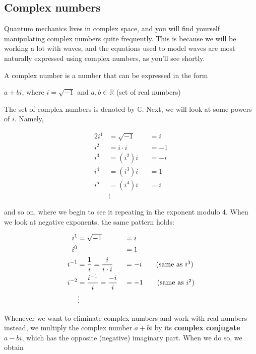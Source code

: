 \subsection{Complex numbers} \label{sec:complex}

Quantum mechanics lives in complex space, and you will find yourself manipulating complex numbers quite frequently. 
This is because we will be working a lot with waves, and the equations used to model waves are most naturally expressed using complex numbers, as you'll see shortly.

A complex number is a number that can be expressed in the form 

\begin{tcolorbox}[title=Complex numbers]
	$a + bi$, where $i = \sqrt{-1}$ and $a,b \in \mathbb{R}$ (set of real numbers)
\end{tcolorbox}

The set of complex numbers is denoted by $\mathbb{C}$.
Next, we will look at some powers of $i$. 
Namely,

\begin{alignat*}{2}
	i^1 &= \sqrt{-1} &&=  i \\
	i^2 &= i \cdot i &&= -1 \\
	i^3 &= (i^2)i    &&= -i \\
	i^4 &= (i^3)i    &&=  1 \\
	i^5 &= (i^4)i    &&=  i \tag{same as $i^1$}\\
	& \vdots &&
\end{alignat*}

\noindent and so on, where we begin to see it repeating in the exponent modulo 4. 
When we look at negative exponents, the same pattern holds:

\begin{alignat*}{2}
	i^1 &= \sqrt{-1} &&= i \\
	i^0 & &&= 1 \\
	i^{-1} &= \dfrac{1}{i} = \dfrac{i}{i\cdot i} &&= -i \tag{same as $i^{3}$} \\
	i^{-2} &= \dfrac{i^{-1}}{i} = \dfrac{-i}{i} &&= -1 \tag{same as $i^2$} \\
	& \vdots &&
\end{alignat*}

Whenever we want to eliminate complex numbers and work with real numbers instead, we multiply the complex number $a+bi$ by its \textbf{complex conjugate} $a-bi$, which has the opposite (negative) imaginary part. 
When we do so, we obtain 

